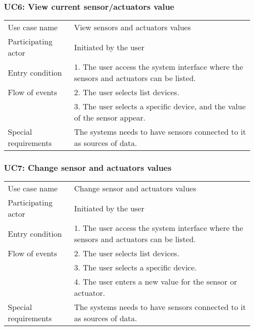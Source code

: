 \subsubsection{UC6: View current sensor/actuators value}
\label{sec:notify}
\begin{tabular}{ l p{11cm} }
	\hline                       
	Use case name & View sensors and actuators values\\
	Participating actor & Initiated by the user\\
	Entry condition & 1. The user access the system interface where the sensors and actuators can be listed. \\
	Flow of events & 2. The user selects list devices. \\
	 & 3. The user selects a  specific device, and the value of the sensor appear. \\
	Special requirements & The systems needs to have sensors connected to it as sources of data.\\
	\hline
\end{tabular}


\subsubsection{UC7: Change sensor and actuators values}
\label{sec:notify}
\begin{tabular}{ l p{11cm} }
	\hline                       
	Use case name & Change sensor and actuators values\\
	Participating actor & Initiated by the user\\
	Entry condition & 1. The user access the system interface where the sensors and actuators can be listed. \\
	Flow of events & 2. The user selects list devices. \\
	& 3. The user selects a  specific device. \\
	& 4. The user enters a new value for the sensor or actuator. \\
	Special requirements & The systems needs to have sensors connected to it as sources of data.\\
	\hline
\end{tabular}



